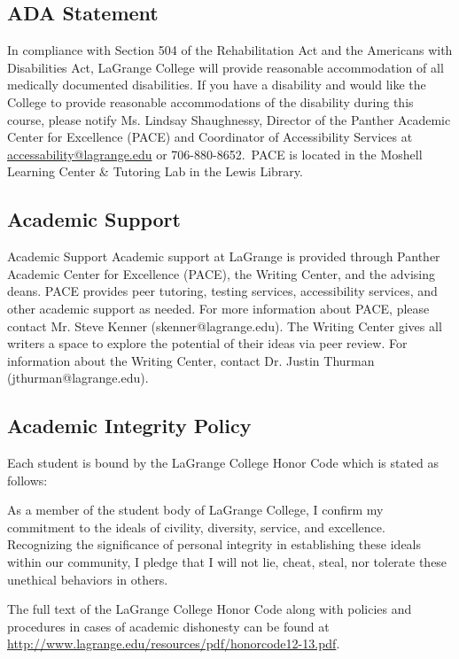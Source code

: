 \documentclass[11pt]{article}
\begin{document}
\subsection*{ADA Statement}

In compliance with Section 504 of the Rehabilitation Act and the Americans with Disabilities Act,
LaGrange College will provide reasonable accommodation of all medically documented disabilities. If you
have a disability and would like the College to provide reasonable accommodations of the disability during
this course, please notify Ms. Lindsay Shaughnessy, Director of the Panther Academic Center for
Excellence (PACE) and Coordinator of Accessibility Services at \href{mailto:accessability@lagrange.edu}{accessability@lagrange.edu} or 706-880-8652. PACE is located in the Moshell Learning Center \&
Tutoring Lab in the Lewis Library.


\subsection*{Academic Support}

Academic Support
Academic support at LaGrange is provided through Panther Academic Center for Excellence (PACE), the
Writing Center, and the advising deans. PACE provides peer tutoring, testing services, accessibility
services, and other academic support as needed. For more information about PACE, please contact Mr.
Steve Kenner (skenner@lagrange.edu). The Writing Center gives all writers a space to explore the potential of their ideas via peer review. For information about the Writing Center, contact Dr. Justin Thurman
(jthurman@lagrange.edu).

\subsection*{Academic Integrity Policy}

Each student is bound by the LaGrange College Honor Code which is stated as follows:

\begin{displayquote}
As a member of the student body of LaGrange College, I confirm my
commitment to the ideals of civility, diversity, service, and excellence.
Recognizing the significance of personal integrity in establishing these ideals
within our community, I pledge that I will not lie, cheat, steal, nor tolerate these
unethical behaviors in others.
\end{displayquote}

The full text of the LaGrange College Honor Code along with policies and procedures in cases of academic
dishonesty can be found at \url{http://www.lagrange.edu/resources/pdf/honorcode12-13.pdf}.
\end{document}
